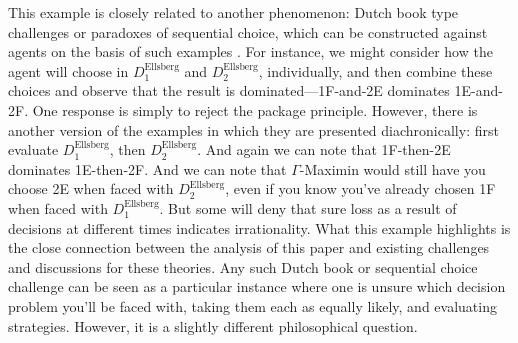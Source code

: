 \documentclass[a4paper]{article}
\newenvironment{CCM rewritten}
{\begingroup\color{blue}} %
{\endgroup}              %
\begin{document}
	This example is closely related to another phenomenon: Dutch book type challenges or paradoxes of sequential choice, which can be constructed against agents on the basis of such examples \citep{seidenfeld2004contrast,elga2010sp}. 
	For instance, we might consider how the agent will choose in $D^{\mathrm{Ellsberg}}_1$ and $D^{\mathrm{Ellsberg}}_2$, individually, and then combine these choices and observe that the result is dominated---1F-and-2E dominates 1E-and-2F. One response is simply to reject the package principle. However, there is another version of the examples in which they are presented diachronically: first evaluate $D^{\mathrm{Ellsberg}}_1$, then $D^{\mathrm{Ellsberg}}_2$. And again we can note that 1F-then-2E dominates 1E-then-2F. And we can note that $\Gamma$-Maximin would still have you choose 2E when faced with $D^{\mathrm{Ellsberg}}_2$, even if you know you've already chosen 1F when faced with $D^{\mathrm{Ellsberg}}_1$. But some will deny that sure loss as a result of decisions at different times indicates irrationality.
		What this example highlights is the close connection between the analysis of this paper and existing challenges and discussions for these theories. Any such Dutch book or sequential choice challenge can be seen as a particular instance where one is unsure which decision problem you'll be faced with, taking them each as equally likely, and evaluating strategies. However, it is a slightly different philosophical question.

\end{document}
